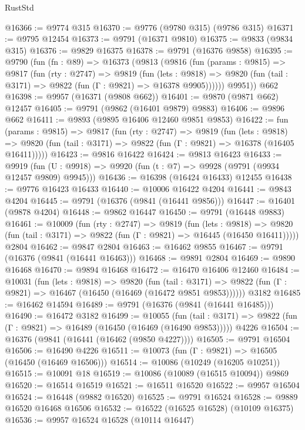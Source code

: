 \begin{lexlean}{RustStd}
\begin{coremodule}
@16366 := @9774 @315
@16370 := @9776 (@9780 @315) (@9786 @315)
@16371 := @9795 @12454
@16373 := @9791 (@16371 @9810)
@16375 := @9833 (@9834 @315)
@16376 := @9829 @16375
@16378 := @9791 (@16376 @9858)
@16395 := @9790
    (fun (fn : @89) =>
    @16373
      (@9813
        (@9816
          (fun (params : @9815) =>
          @9817
            (fun (rty : @2747) =>
            @9819
              (fun (lets : @9818) =>
              @9820 (fun (tail : @3171) => @9822 (fun (Γ : @9821) => @16378 @9905))))))
        @9951))
    @662
@16398 := @9957 (@16371 (@9808 @662))
@16401 := @9870 (@9871 @662) @12457
@16405 := @9791 (@9862 (@16401 @9879) @9883)
@16406 := @9896 @662
@16411 := @9893 (@9895 @16406 @12460 @9851 @9853)
@16422 := fun (params : @9815) =>
  @9817
    (fun (rty : @2747) =>
    @9819
      (fun (lets : @9818) =>
      @9820 (fun (tail : @3171) => @9822 (fun (Γ : @9821) => @16378 (@16405 @16411)))))
@16423 := @9816 @16422
@16424 := @9813 @16423
@16433 := @9919
    (fun (U : @9918) => @9920 (fun (t : @7) => @9928 (@9791 (@9934 @12457 @9809) @9945)))
@16436 := @16398 (@16424 @16433) @12455
@16438 := @9776 @16423 @16433
@16440 := @10006 @16422 @4204
@16441 := @9843 @4204
@16445 := @9791 (@16376 (@9841 (@16441 @9856)))
@16447 := @16401 (@9878 @4204)
@16448 := @9862 @16447
@16450 := @9791 (@16448 @9883)
@16461 := @10009
    (fun (rty : @2747) =>
    @9819
      (fun (lets : @9818) =>
      @9820 (fun (tail : @3171) => @9822 (fun (Γ : @9821) => @16445 (@16450 @16411)))))
    @2804
@16462 := @9847 @2804
@16463 := @16462 @9855
@16467 := @9791 (@16376 (@9841 (@16441 @16463)))
@16468 := @9891 @2804
@16469 := @9890 @16468
@16470 := @9894 @16468
@16472 := @16470 @16406 @12460
@16484 := @10031
    (fun (lets : @9818) =>
    @9820
      (fun (tail : @3171) =>
      @9822 (fun (Γ : @9821) => @16467 (@16450 (@16469 (@16472 @9851 @9853))))))
    @3182
@16485 := @16462 @14594
@16489 := @9791 (@16376 (@9841 (@16441 @16485)))
@16490 := @16472 @3182
@16499 := @10055
    (fun (tail : @3171) => @9822 (fun (Γ : @9821) => @16489 (@16450 (@16469 (@16490 @9853)))))
    @4226
@16504 := @16376 (@9841 (@16441 (@16462 (@9850 @4227))))
@16505 := @9791 @16504
@16506 := @16490 @4226
@16511 := @10073 (fun (Γ : @9821) => @16505 (@16450 (@16469 @16506)))
@16514 := @10086 (@10249 (@16205 @10251))
@16515 := @10091 @18
@16519 := @10086 (@10089 (@16515 @10094)) @9869
@16520 := @16514 @16519
@16521 := @16511 @16520
@16522 := @9957 @16504
@16524 := @16448 (@9882 @16520)
@16525 := @9791 @16524
@16528 := @9889 @16520 @16468 @16506
@16532 := @16522 (@16525 @16528) (@10109 @16375)
@16536 := @9957 @16524 @16528 (@10114 @16447)

\end{coremodule}
\end{lexlean}
